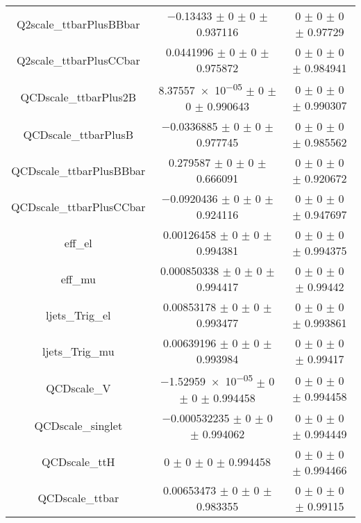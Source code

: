\begin{table}
\begin{tabular}{ccc}
Q2scale\_ttbarPlusBBbar & \num{-0.13433} $\pm$ \num{0} $\pm$ \num{0} $\pm$ \num{0.937116} & \num{0} $\pm$ \num{0} $\pm$ \num{0} $\pm$ \num{0.97729}\\
Q2scale\_ttbarPlusCCbar & \num{0.0441996} $\pm$ \num{0} $\pm$ \num{0} $\pm$ \num{0.975872} & \num{0} $\pm$ \num{0} $\pm$ \num{0} $\pm$ \num{0.984941}\\
QCDscale\_ttbarPlus2B & \num{8.37557e-05} $\pm$ \num{0} $\pm$ \num{0} $\pm$ \num{0.990643} & \num{0} $\pm$ \num{0} $\pm$ \num{0} $\pm$ \num{0.990307}\\
QCDscale\_ttbarPlusB & \num{-0.0336885} $\pm$ \num{0} $\pm$ \num{0} $\pm$ \num{0.977745} & \num{0} $\pm$ \num{0} $\pm$ \num{0} $\pm$ \num{0.985562}\\
QCDscale\_ttbarPlusBBbar & \num{0.279587} $\pm$ \num{0} $\pm$ \num{0} $\pm$ \num{0.666091} & \num{0} $\pm$ \num{0} $\pm$ \num{0} $\pm$ \num{0.920672}\\
QCDscale\_ttbarPlusCCbar & \num{-0.0920436} $\pm$ \num{0} $\pm$ \num{0} $\pm$ \num{0.924116} & \num{0} $\pm$ \num{0} $\pm$ \num{0} $\pm$ \num{0.947697}\\
eff\_el & \num{0.00126458} $\pm$ \num{0} $\pm$ \num{0} $\pm$ \num{0.994381} & \num{0} $\pm$ \num{0} $\pm$ \num{0} $\pm$ \num{0.994375}\\
eff\_mu & \num{0.000850338} $\pm$ \num{0} $\pm$ \num{0} $\pm$ \num{0.994417} & \num{0} $\pm$ \num{0} $\pm$ \num{0} $\pm$ \num{0.99442}\\
ljets\_Trig\_el & \num{0.00853178} $\pm$ \num{0} $\pm$ \num{0} $\pm$ \num{0.993477} & \num{0} $\pm$ \num{0} $\pm$ \num{0} $\pm$ \num{0.993861}\\
ljets\_Trig\_mu & \num{0.00639196} $\pm$ \num{0} $\pm$ \num{0} $\pm$ \num{0.993984} & \num{0} $\pm$ \num{0} $\pm$ \num{0} $\pm$ \num{0.99417}\\
QCDscale\_V & \num{-1.52959e-05} $\pm$ \num{0} $\pm$ \num{0} $\pm$ \num{0.994458} & \num{0} $\pm$ \num{0} $\pm$ \num{0} $\pm$ \num{0.994458}\\
QCDscale\_singlet & \num{-0.000532235} $\pm$ \num{0} $\pm$ \num{0} $\pm$ \num{0.994062} & \num{0} $\pm$ \num{0} $\pm$ \num{0} $\pm$ \num{0.994449}\\
QCDscale\_ttH & \num{0} $\pm$ \num{0} $\pm$ \num{0} $\pm$ \num{0.994458} & \num{0} $\pm$ \num{0} $\pm$ \num{0} $\pm$ \num{0.994466}\\
QCDscale\_ttbar & \num{0.00653473} $\pm$ \num{0} $\pm$ \num{0} $\pm$ \num{0.983355} & \num{0} $\pm$ \num{0} $\pm$ \num{0} $\pm$ \num{0.99115}\\

\end{tabular}
\end{table}
